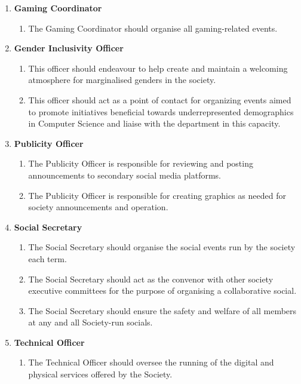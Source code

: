 \documentclass{article}
\begin{document}
\begin{enumerate}
\begin{enumerate}
\begin{enumerate}
        \end{enumerate}
        \item \textbf{Gaming Coordinator}
        \begin{enumerate}
            \item The Gaming Coordinator should organise all gaming-related events.
        \end{enumerate}
        \item \textbf{Gender Inclusivity Officer}
        \begin{enumerate}
            \item This officer should endeavour to help create and maintain a welcoming atmosphere for marginalised genders in the society.
            \item This officer should act as a point of contact for organizing events aimed to promote initiatives beneficial towards underrepresented demographics in Computer Science and liaise with the department in this capacity.
        \end{enumerate}
        \item \textbf{Publicity Officer}
        \begin{enumerate}
            \item The Publicity Officer is responsible for reviewing and posting announcements to secondary social media platforms.
            \item The Publicity Officer is responsible for creating graphics as needed for society announcements and operation.
        \end{enumerate}
        \item \textbf{Social Secretary}
        \begin{enumerate}
            \item The Social Secretary should organise the social events run by the society each term.
            \item The Social Secretary should act as the convenor with other society executive committees for the purpose of organising a collaborative social.
            \item The Social Secretary should ensure the safety and welfare of all members at any and all Society-run socials.
        \end{enumerate}
        \item \textbf{Technical Officer}
        \begin{enumerate}
            \item The Technical Officer should oversee the running of the digital and physical services offered by the Society.

\end{enumerate}
\end{enumerate}
\end{enumerate}
\end{document}
